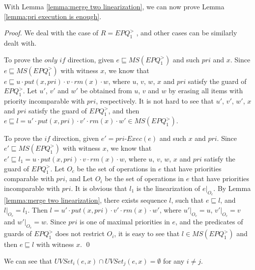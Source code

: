 With Lemma \ref{lemma:merge two linearization}, we can now prove Lemma \ref{lemma:pri execution is enough}.

\priExecutionIsEnough*
\begin {proof}

We deal with the case of $R = \textit{EPQ}_1^{>}$ , and other cases can be similarly dealt with.

To prove the $\textit{only if}$ direction, given $e \sqsubseteq \textit{MS}(\textit{EPQ}_1^{>})$ and such $\textit{pri}$ and $x$. Since $e \sqsubseteq \textit{MS}(\textit{EPQ}_1^{>})$ with witness $x$, we know that $e \sqsubseteq u \cdot \textit{put}(x,\textit{pri}) \cdot v \cdot \textit{rm}(x) \cdot w$, where $u$, $v$, $w$, $x$ and $\textit{pri}$ satisfy the guard of $\textit{EPQ}_1^{>}$. Let $u'$, $v'$ and $w'$ be obtained from $u$, $v$ and $w$ by erasing all items with priority incomparable with $\textit{pri}$, respectively. It is not hard to see that $u'$, $v'$, $w'$, $x$ and $\textit{pri}$ satisfy the guard of $\textit{EPQ}_1^{>}$, and then $e \sqsubseteq l = u' \cdot \textit{put}(x,\textit{pri}) \cdot v' \cdot \textit{rm}(x) \cdot w' \in \textit{MS}(\textit{EPQ}_1^{>})$.

To prove the $\textit{if}$ direction, given $e' = \textit{pri-Exec}(e)$ and such $x$ and $\textit{pri}$. Since $e' \sqsubseteq \textit{MS}(\textit{EPQ}_1^{>})$ with witness $x$, we know that $e' \sqsubseteq l_1 = u \cdot \textit{put}(x,\textit{pri}) \cdot v \cdot \textit{rm}(x) \cdot w$, where $u$, $v$, $w$, $x$ and $\textit{pri}$ satisfy the guard of $\textit{EPQ}_1^{>}$. Let $O_c$ be the set of operations in $e$ that have priorities comparable with $\textit{pri}$, and Let $O_i$ be the set of operations in $e$ that have priorities incomparable with $\textit{pri}$. It is obvious that $l_1$ is the linearization of $e \vert_{O_c}$. By Lemma \ref{lemma:merge two linearization}, there exists sequence $l$, such that $e \sqsubseteq l$, and $l \vert_{O_c} = l_1$. Then $l = u' \cdot \textit{put}(x,\textit{pri}) \cdot v' \cdot \textit{rm}(x) \cdot w'$, where $u' \vert_{O_c} = u$, $v' \vert_{O_c} = v$ and $w' \vert_{O_c} = w$. Since $\textit{pri}$ is one of maximal priorities in $e$, and the predicates of guards of $\textit{EPQ}_1^{>}$ does not restrict $O_i$, it is easy to see that $l \in \textit{MS}(\textit{EPQ}_1^{>})$ and then $e \sqsubseteq l$ with witness $x$. \qed
\end {proof}


We can see that $\textit{UVSet}_i(e,x) \cap \textit{UVSet}_j(e,x) = \emptyset$ for any $i \neq j$.

